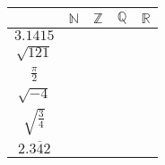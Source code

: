 \begin{questions}
\begin{qblock}
\begin{multicols}{2}
			\begin{tabular}{|c|c|c|c|c|}
				\hline
				& $ \mathbb{N}$ & $ \mathbb{Z}  $ & $ \mathbb{Q}$ & $ \mathbb{R} $ \\
				\hline
				$ 3.1415 $       &               &                 &    \solonly{\checkmark }            &      \solonly{\checkmark }           \\
				\hline
				$ \sqrt{121} $     &  \solonly{\checkmark }              &    \solonly{\checkmark }              &   \solonly{\checkmark }             &   \solonly{\checkmark }              \\
				\hline
				$ \frac{\pi}{2} $    &               &                 &               &   \solonly{\checkmark }              \\
				\hline
				$ \sqrt{-4} $      &               &                 &               &                \\
				\hline
				$ \sqrt{\frac{3}{4}} $ &               &                 &               &    \solonly{\checkmark }             \\
				\hline
				$ 2.\overline{342} $  &               &                 &    \solonly{\checkmark }            &    \solonly{\checkmark }             \\
				\hline
			\end{tabular}
			
		\end{multicols}
\end{qblock}

\end{questions}



